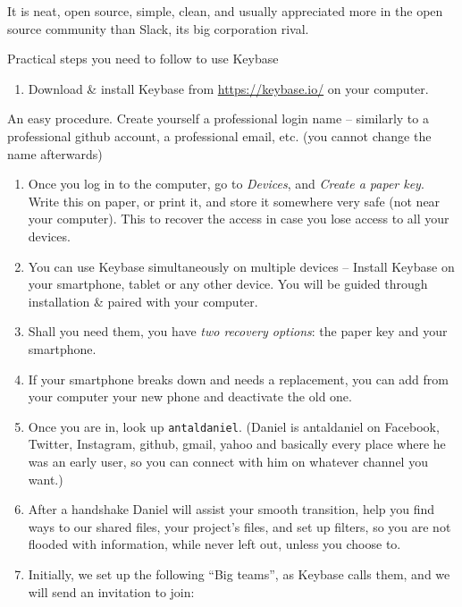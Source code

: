 \documentclass[
  fontsize=13pt,
  english,
  a4paper,
  openany, a4paper, oneside]{book}
\providecommand{\tightlist}{%
  \setlength{\itemsep}{0pt}\setlength{\parskip}{0pt}}
\begin{document}
It is neat, open source, simple, clean, and usually appreciated more in the open source community than Slack, its big corporation rival.

Practical steps you need to follow to use Keybase

\begin{enumerate}
\def\labelenumi{\arabic{enumi}.}
\tightlist
\item
  Download \& install Keybase from \url{https://keybase.io/} on your computer.
\end{enumerate}

An easy procedure. Create yourself a professional login name -- similarly to a professional github account, a professional email, etc. (you cannot change the name afterwards)

\begin{enumerate}
\def\labelenumi{\arabic{enumi}.}
\setcounter{enumi}{1}
\item
  Once you log in to the computer, go to \emph{Devices}, and \emph{Create a paper key}. Write this on paper, or print it, and store it somewhere very safe (not near your computer). This to recover the access in case you lose access to all your devices.
\item
  You can use Keybase simultaneously on multiple devices -- Install Keybase on your smartphone, tablet or any other device. You will be guided through installation \& paired with your computer.
\item
  Shall you need them, you have \emph{two recovery options}: the paper key and your smartphone.
\item
  If your smartphone breaks down and needs a replacement, you can add from your computer your new phone and deactivate the old one.
\item
  Once you are in, look up \texttt{antaldaniel}. (Daniel is antaldaniel on Facebook, Twitter, Instagram, github, gmail, yahoo and basically every place where he was an early user, so you can connect with him on whatever channel you want.)
\item
  After a handshake Daniel will assist your smooth transition, help you find ways to our shared files, your project's files, and set up filters, so you are not flooded with information, while never left out, unless you choose to.
\item
  Initially, we set up the following ``Big teams'', as Keybase calls them, and we will send an invitation to join:
\end{enumerate}
\end{document}
